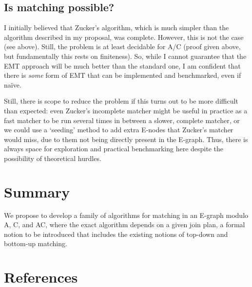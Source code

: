 \documentclass{article}
\theoremstyle{definition}
\begin{document}
\subsection{Is matching possible?}
I initially believed that Zucker's algorithm, which is much simpler than the algorithm described in my proposal, was complete. However, this is not the case (see above). Still, the problem is at least decidable for A/C (proof given above, but fundamentally this rests on finiteness). So, while I cannot guarantee that the EMT approach will be much better than the standard one, I am confident that there is \textit{some} form of EMT that can be implemented and benchmarked, even if na\"ive.

Still, there is scope to reduce the problem if this turns out to be more difficult than expected: even Zucker's incomplete matcher might be useful in practice as a fast matcher to be run several times in between a slower, complete matcher, or we could use a `seeding' method to add extra E-nodes that Zucker's matcher would miss, due to them not being directly present in the E-graph. Thus, there is always space for exploration and practical benchmarking here despite the possibility of theoretical hurdles.

\section{Summary}
We propose to develop a family of algorithms for matching in an E-graph modulo A, C, and AC, where the exact algorithm depends on a given join plan, a formal notion to be introduced that includes the existing notions of top-down and bottom-up matching.

\section{References}

\printbibliography
\end{document}
